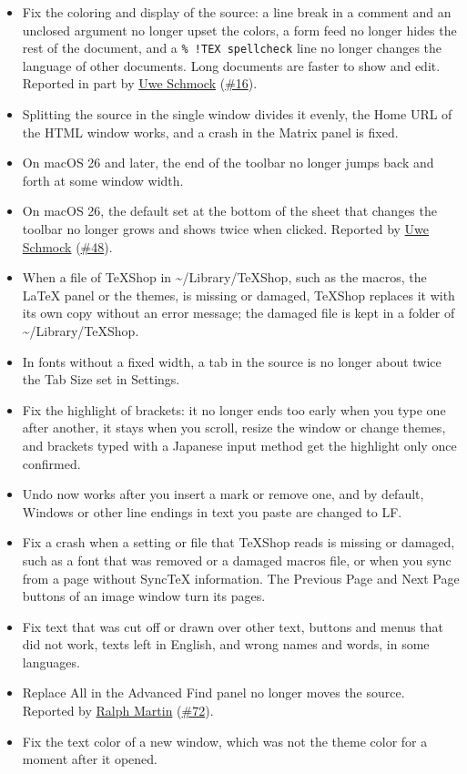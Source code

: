 \documentclass[11pt,letterpaper]{article}
\begin{document}
\begin{itemize}
\item Fix the coloring and display of the source: a line break in a comment and an unclosed argument no longer upset the colors, a form feed no longer hides the rest of the document, and a \texttt{\% !TEX spellcheck} line no longer changes the language of other documents. Long documents are faster to show and edit. Reported in part by \href{https://github.com/Uwe-Schmock}{Uwe Schmock} (\href{https://github.com/TeXShopProject/TeXShop/issues/16}{\#16}).
\item Splitting the source in the single window divides it evenly, the Home URL of the HTML window works, and a crash in the Matrix panel is fixed.
\item On macOS 26 and later, the end of the toolbar no longer jumps back and forth at some window width.
\item On macOS 26, the default set at the bottom of the sheet that changes the toolbar no longer grows and shows twice when clicked. Reported by \href{https://github.com/Uwe-Schmock}{Uwe Schmock} (\href{https://github.com/TeXShopProject/TeXShop/issues/48}{\#48}).
\item When a file of TeXShop in \textasciitilde{}/Library/TeXShop, such as the macros, the LaTeX panel or the themes, is missing or damaged, TeXShop replaces it with its own copy without an error message; the damaged file is kept in a folder of \textasciitilde{}/Library/TeXShop.
\item In fonts without a fixed width, a tab in the source is no longer about twice the Tab Size set in Settings.
\item Fix the highlight of brackets: it no longer ends too early when you type one after another, it stays when you scroll, resize the window or change themes, and brackets typed with a Japanese input method get the highlight only once confirmed.
\item Undo now works after you insert a mark or remove one, and by default, Windows or other line endings in text you paste are changed to LF.
\item Fix a crash when a setting or file that TeXShop reads is missing or damaged, such as a font that was removed or a damaged macros file, or when you sync from a page without SyncTeX information. The Previous Page and Next Page buttons of an image window turn its pages.
\item Fix text that was cut off or drawn over other text, buttons and menus that did not work, texts left in English, and wrong names and words, in some languages.
\item Replace All in the Advanced Find panel no longer moves the source. Reported by \href{https://github.com/ralphrmartin}{Ralph Martin} (\href{https://github.com/TeXShopProject/TeXShop/issues/72}{\#72}).
\item Fix the text color of a new window, which was not the theme color for a moment after it opened.
\end{itemize}
\end{document}
